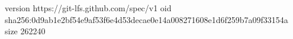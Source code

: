 version https://git-lfs.github.com/spec/v1
oid sha256:0d9ab1e2bf54e9af53f6e4d53decae0e14a008271608e1d6f259b7a09f33154a
size 262240
